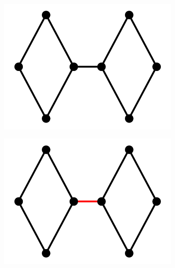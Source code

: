 \begin{figure}[H]
    \begin{center}
        \begin{subfigure}[b]{0.3\textwidth}
            \includegraphics[width=\textwidth]{img/3/1}
            \caption{}
            \label{}
        \end{subfigure}
        \begin{subfigure}[b]{0.3\textwidth}
            \includegraphics[width=\textwidth]{img/3/2}
            \caption{}
            \label{}
        \end{subfigure}
        \begin{subfigure}[b]{0.3\textwidth}

\end{subfigure}
\end{center}
\end{figure}
